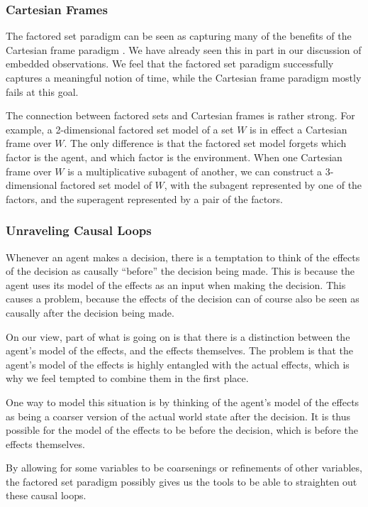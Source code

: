 \documentclass[authordate,onecolumn]{miri-tech-article}
\begin{document}
\subsubsection{Cartesian Frames}
The factored set paradigm can be seen as capturing many of the benefits of the Cartesian frame paradigm \citep{Garrabrant:2020}. We have already seen this in part in our discussion of embedded observations. We feel that the factored set paradigm successfully captures a meaningful notion of time, while the Cartesian frame paradigm mostly fails at this goal.

The connection between factored sets and Cartesian frames is rather strong. For example, a 2-dimensional factored set model of a set $W$ is in effect a Cartesian frame over $W$. The only difference is that the factored set model forgets which factor is the agent, and which factor is the environment. When one Cartesian frame over $W$ is a multiplicative subagent of another, we can construct a 3-dimensional factored set model of $W$, with the subagent represented by one of the factors, and the superagent represented by a pair of the factors.

\subsubsection{Unraveling Causal Loops}
Whenever an agent makes a decision, there is a temptation to think of the effects of the decision as causally ``before'' the decision being made. This is because the agent uses its model of the effects as an input when making the decision. This causes a problem, because the effects of the decision can of course also be seen as causally after the decision being made.

On our view, part of what is going on is that there is a distinction between the agent's model of the effects, and the effects themselves. The problem is that the agent's model of the effects is highly entangled with the actual effects, which is why we feel tempted to combine them in the first place.

One way to model this situation is by thinking of the agent's model of the effects as being a coarser version of the actual world state after the decision. It is thus possible for the model of the effects to be before the decision, which is before the effects themselves.

By allowing for some variables to be coarsenings or refinements of other variables, the factored set paradigm possibly gives us the tools to be able to straighten out these causal loops.
\end{document}
